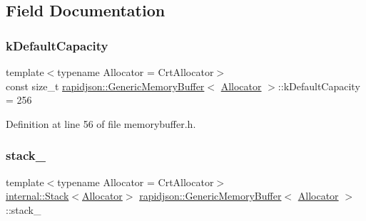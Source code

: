\subsection{Field Documentation}
\mbox{\label{structrapidjson_1_1_generic_memory_buffer_abaa207fb3f94da48b0c91755828f98b3}} 
\subsubsection{\texorpdfstring{kDefaultCapacity}{kDefaultCapacity}}
{\footnotesize\ttfamily template$<$typename Allocator  = Crt\+Allocator$>$ \\
const size\+\_\+t \mbox{\hyperlink{structrapidjson_1_1_generic_memory_buffer}{rapidjson\+::\+Generic\+Memory\+Buffer}}$<$ \mbox{\hyperlink{classrapidjson_1_1_allocator}{Allocator}} $>$\+::k\+Default\+Capacity = 256\hspace{0.3cm}{\ttfamily [static]}}



Definition at line 56 of file memorybuffer.\+h.

\mbox{\label{structrapidjson_1_1_generic_memory_buffer_a80a159ebb64cee80b5e7fc37f971d5a5}} 
\subsubsection{\texorpdfstring{stack\_}{stack\_}}
{\footnotesize\ttfamily template$<$typename Allocator  = Crt\+Allocator$>$ \\
\mbox{\hyperlink{classrapidjson_1_1internal_1_1_stack}{internal\+::\+Stack}}$<$\mbox{\hyperlink{classrapidjson_1_1_allocator}{Allocator}}$>$ \mbox{\hyperlink{structrapidjson_1_1_generic_memory_buffer}{rapidjson\+::\+Generic\+Memory\+Buffer}}$<$ \mbox{\hyperlink{classrapidjson_1_1_allocator}{Allocator}} $>$\+::stack\+\_\+\hspace{0.3cm}{\ttfamily [mutable]}}



